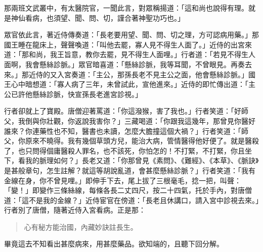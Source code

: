 那兩班文武叢中，有太醫院官，一聞此言，對眾稱揚道：「這和尚也說得有理。就是神仙看病，也須望、聞、問、切，謹合著神聖功巧也。」

眾官依此言，著近侍傳奏道：「長老要用望、聞、問、切之理，方可認病用藥。」那國王睡在龍床上，聲聲喚道：「叫他去罷，寡人見不得生人面了。」近侍的出宮來道：「那和尚，我王旨意，教你去罷，見不得生人面哩。」行者道：「若見不得生人面啊，我會懸絲診脈。」眾官暗喜道：「懸絲診脈，我等耳聞，不曾眼見。再奏去來。」那近侍的又入宮奏道：「主公，那孫長老不見主公之面，他會懸絲診脈。」國王心中暗想道：「寡人病了三年，未曾試此，宣他進來。」近侍的即忙傳出道：「主公已許他懸絲診脈，快宣孫長老進宮診視。」

行者卻就上了寶殿。唐僧迎著罵道：「你這潑猴，害了我也。」行者笑道：「好師父，我倒與你壯觀，你返說我害你？」三藏喝道：「你跟我這幾年，那曾見你醫好誰來？你連藥性也不知，醫書也未讀，怎麼大膽撞這個大禍？」行者笑道：「師父，你原來不曉得。我有幾個草頭方兒，能治大病，管情醫得他好便了。就是醫殺了，也只問得個庸醫殺人罪名，也不該死，你怕怎的！不打緊，不打緊，你且坐下，看我的脈理如何？」長老又道：「你那曾見《素問》、《難經》、《本草》、《脈訣》是甚般章句，怎生註解？就這等胡說亂道，會甚麼懸絲診脈？」行者笑道：「我有金線在身，你不曾見哩。」即伸手下去，尾上拔了三根毫毛，捻一把，叫聲：「變！」即變作三條絲線，每條各長二丈四尺，按二十四氣，托於手內，對唐僧道：「這不是我的金線？」近侍宦官在傍道：「長老且休講口，請入宮中診視去來。」行者別了唐僧，隨著近侍入宮看病。正是那：
\begin{quote}
心有秘方能治國，內藏妙訣註長生。
\end{quote}

畢竟這去不知看出甚麼病來，用甚麼藥品。欲知端的，且聽下回分解。
